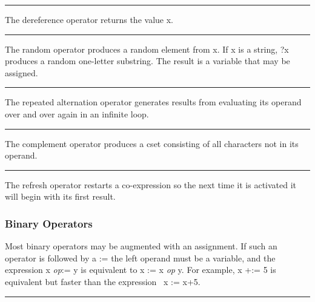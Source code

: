 \bigskip\hrule\vspace{0.1cm}

\noindent
The dereference operator returns the value
\textsf{x}.

\bigskip\hrule\vspace{0.1cm}

\noindent
The random operator produces a random element
from \textsf{x}. If \textsf{x} is a string, \textsf{?x} produces a
random one-letter substring. The result is a variable that may be
assigned.

\bigskip\hrule\vspace{0.1cm}

\noindent
The repeated alternation operator generates
results from evaluating its operand over and over again in an infinite
loop.

\bigskip\hrule\vspace{0.1cm}

\noindent
The complement operator produces a cset
consisting of all characters not in its operand.

\bigskip\hrule\vspace{0.1cm}

\noindent
{}The refresh operator restarts a
co-expression so the next time it is activated it will begin with its
first result.

\subsubsection[Binary Operators]{Binary Operators}

Most binary operators may be augmented with an
assignment. If such an operator is followed
by a \textsf{:=} the left operand must be a variable, and the
expression \textsf{x }\textsf{\textit{op}}\textsf{:= y} is equivalent
to \textsf{x := x }\textsf{\textit{op}}\textsf{ y}. For example,
\textsf{x +:= 5} is equivalent but faster than the expression
\ \textsf{x := x+5.}

\bigskip\hrule\vspace{0.1cm}

